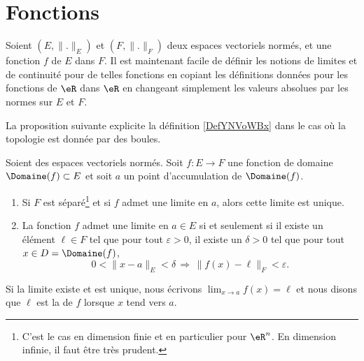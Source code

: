 
\section{Fonctions}		\label{Sect_fonctions}

Soient $(E,\| . \|_E)$ et $(F,\| . \|_F)$ deux espaces vectoriels normés, et une fonction $f$ de $E$ dans $F$. Il est maintenant facile de définir les notions de limites et de continuité pour de telles fonctions en copiant les définitions données pour les fonctions de $\eR$ dans $\eR$ en changeant simplement les valeurs absolues par les normes sur $E$ et $F$.

La proposition suivante explicite la définition \ref{DefYNVoWBx} dans le cas où la topologie est donnée par des boules.
\begin{proposition}\label{PropHOCWooSzrMjl}
    Soient des espaces vectoriels normés.  Soit $f\colon E\to F$ une fonction de domaine \( \Domaine(f)\subset E\) et soit $a$ un point d'accumulation de $\Domaine(f)$.
    \begin{enumerate}
        \item
            Si \( F\) est séparé\footnote{C'est le cas en dimension finie et en particulier pour \( \eR^n\). En dimension infinie, il faut être très prudent.} et si \( f\) admet une limite en \( a\), alors cette limite est unique.
        \item       \label{ITEMooSHKNooStKGKH}
    La fonction \( f\) admet une limite en $a\in E$ si et seulement si il existe un élément $\ell\in F$ tel que pour tout $\varepsilon>0$, il existe un $\delta>0$ tel que pour tout $x\in D=\Domaine(f)$,
    \begin{equation}        \label{EqDefLimzxmasubV}
		0<\| x-a \|_E<\delta\,\Rightarrow\,\| f(x)-\ell \|_F<\varepsilon.
	\end{equation}
    \end{enumerate}
	Si la limite existe et est unique, nous écrivons $\lim_{x\to a} f(x)=\ell$ et nous disons que $\ell$ est la  de $f$ lorsque $x$ tend vers $a$.
\end{proposition}

